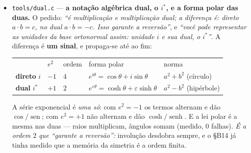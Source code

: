 \documentclass[11pt]{article}
\providecommand{\sen}{\operatorname{sen}}
\providecommand{\senh}{\operatorname{senh}}
\newcommand{\code}[1]{\texttt{\small #1}}
\theoremstyle{plain}
\theoremstyle{remark}
\begin{document}
\begin{itemize}
\textbf{A recursão salta entre as torres, e no fim a dual está vazia.} O comutador $[S,D]=SD-DS$
cancela em \emph{todo} andar interior e sobrevive só nas duas pontas, com sinais opostos: traço
$0$. A torre dual é nilpotente ($D^8=0$) --- \emph{``no fim é uma torre dual vazia, não tem nada,
só a cifra fora do jogo''}. E resta \emph{um} elemento, o mesmo para as duas: $\ker D=\operatorname{coker}
S$, dimensão $1$. A negra leva-o a zero, a branca nunca o produz de dentro; ele não é um andar --- é
o que fica quando as duas se cancelam.

\textbf{E a tese: um corpo é uma antissimetria --- que fecha em si mesma porque guarda a memória da
simetria.} \emph{``Quando você dobra uma folha lisa, ela deixa de ser lisa, simétrica, mas guarda a
simetria ainda: só desdobrar. Um origami.''} A memória tem forma exata: \textbf{a dobra tem ordem
finita}. O conjugado é uma dobra de ordem $2$ ($\overline{\overline x}=x$, exato) --- e é o
\emph{mesmo} objeto de onde saiu o inverso, não dois; o $J$ tem ordem $4$ ($J^4=I$, medido); o $F$
do corpo diferencial tem ordem $4$. Contra isso, uma deformação genérica (escalar por $1{,}3$)
quebra a simetria e some com ela: volta ao início em $0$ de $100$ casos. \emph{Deformar é fácil;
deformar guardando é que é a dobra.} A folha dobrada não é lisa, mas contém a folha lisa inteira ---
e é por isso que o corpo fecha em si mesmo: ele não é o que sobrou da quebra, é \emph{a quebra que
sabe voltar}. É também, dito noutra escala, o \emph{``a dobra, não a iteração''} do projeto: iterar
afasta e não guarda, dobrar afasta e guarda.

\item \code{tools/dual.c} --- \textbf{a notação algébrica dual, o $i^*$, e a forma polar das
duas.} O pedido: \emph{``é multiplicação e multiplicação dual; a diferença é: direto $a\cdot b=c$,
no dual $a\cdot b=-c$. Isso garante a reversão''}, e \emph{``você pode representar as unidades da
base ortonormal assim: unidade $i$ e sua dual, o $i^*$''}. A diferença é \textbf{um sinal}, e
propaga-se até ao fim:
\begin{center}
\begin{tabular}{lllll}
 & $e^2$ & ordem & forma polar & norma \\
\textbf{direto} $i$ & $-1$ & $4$ & $e^{i\theta}=\cos\theta+i\sin\theta$ & $a^2+b^2$ (círculo) \\
\textbf{dual} $i^*$ & $+1$ & $2$ & $e^{\varepsilon\theta}=\cosh\theta+\varepsilon\sinh\theta$ & $a^2-b^2$ (hipérbole) \\
\end{tabular}
\end{center}
A série exponencial é \emph{uma só}: com $e^2=-1$ os termos alternam e dão $\cos/\sen$; com
$e^2=+1$ não alternam e dão $\cosh/\senh$. E a lei polar é a mesma nas duas --- raios multiplicam,
ângulos somam (medido, $0$ falhas). \emph{É a ordem $2$ que ``garante a reversão'':} involução
desdobra sempre, e o §B14 já tinha medido que a memória da simetria é a ordem finita.


\end{itemize}
\end{document}
